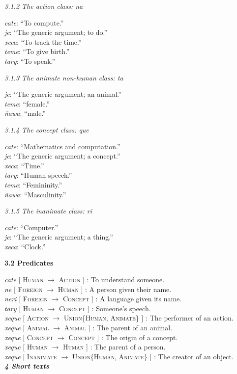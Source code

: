 \documentclass{article}[10pt]
\newcommand{\define}[4]{\emph{#1} [ \textsc{#2} $\rightarrow$ \textsc{#3} ] : #4. \\}
\newcommand{\defarg}[2]{\emph{#1}: ``#2.''\\}
\begin{document}
\emph{3.1.2 The action class: \emph{na}}
\begin{multicols}{3}
\noindent
\defarg{cate}{To compute}
\defarg{je}{The generic argument; to do}
\defarg{xeca}{To track the time}
\defarg{teme}{To give birth}
\defarg{tary}{To speak}
\end{multicols}

\emph{3.1.3 The animate non-human class: \emph{ta}}
\begin{multicols}{3}
\noindent
\defarg{je}{The generic argument; an animal}
\defarg{teme}{female}
\defarg{\~{n}awa}{male}
\end{multicols}

\emph{3.1.4 The concept class: \emph{que}}
\begin{multicols}{3}
\noindent
\defarg{cate}{Mathematics and computation}
\defarg{je}{The generic argument; a concept}
\defarg{xeca}{Time}
\defarg{tary}{Human speech}
\defarg{teme}{Femininity}
\defarg{\~{n}awa}{Masculinity}
\end{multicols}

\emph{3.1.5 The inanimate class: \emph{ri}}
\begin{multicols}{3}
\noindent
\defarg{cate}{Computer}
\defarg{je}{The generic argument; a thing}
\defarg{xeca}{Clock}
\end{multicols}

{\bf 3.2 Predicates}

\noindent
\define{cate}{Human}{Action}{To understand someone}
\define{ne}{Foreign}{Human}{A person given their name}
\define{neri}{Foreign}{Concept}{A language given its name}
\define{tary}{Human}{Concept}{Someone's speech}
\define{xeque}{Action}{Union\{Human, Animate\}}{The performer of an action}
\define{xeque}{Animal}{Animal}{The parent of an animal}
\define{xeque}{Concept}{Concept}{The origin of a concept}
\define{xeque}{Human}{Human}{The parent of a person}
\define{xeque}{Inanimate}{Union\{Human, Animate\}}{The creator of an object}

\clearpage
{\bf \emph{4 Short texts}}\\
\end{document}
